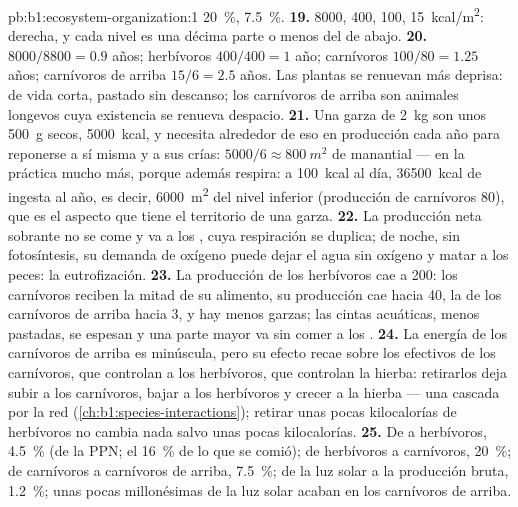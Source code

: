\begin{solution}{pb:b1:ecosystem-organization:1}
\qty{20}{\%}, \qty{7.5}{\%}.
\textbf{19.} \qty{8000}{}, \qty{400}{}, \qty{100}{}, \qty{15}{kcal/m^2}:
derecha, y cada nivel es una décima parte o menos del de abajo.
\textbf{20.}  $8000/8800 = 0.9$ años; herbívoros $400/400 =
1$ año; carnívoros $100/80 = 1.25$ años; carnívoros de arriba $15/6 =
2.5$ años. Las plantas se renuevan más deprisa:  de vida corta,
pastado sin descanso; los carnívoros de arriba son animales longevos cuya
existencia se renueva despacio.
\textbf{21.} Una garza de \qty{2}{kg} son unos \qty{500}{g} secos,
\qty{5000}{kcal}, y necesita alrededor de eso en producción cada año para
reponerse a sí misma y a sus crías: $5000/6 \approx \qty{800}{m^2}$ de
manantial --- en la práctica mucho más, porque además respira: a
\qty{100}{kcal} al día, \qty{36500}{kcal} de ingesta al año, es decir,
\qty{6000}{m^2} del nivel inferior (producción de carnívoros
\qty{80}{}), que es el aspecto que tiene el territorio de una garza.
\textbf{22.} La producción neta sobrante no se come y va a los
, cuya respiración se duplica; de noche, sin
fotosíntesis, su demanda de oxígeno puede dejar el agua sin oxígeno y matar
a los peces: la eutrofización.
\textbf{23.} La producción de los herbívoros cae a \qty{200}{}: los
carnívoros reciben la mitad de su alimento, su producción cae hacia
\qty{40}{}, la de los carnívoros de arriba hacia 3, y hay menos garzas; las
cintas acuáticas, menos pastadas, se espesan y una parte mayor va sin comer
a los .
\textbf{24.} La energía de los carnívoros de arriba es minúscula, pero su
efecto recae sobre los efectivos de los carnívoros, que controlan a los
herbívoros, que controlan la hierba: retirarlos deja subir a los carnívoros,
bajar a los herbívoros y crecer a la hierba --- una cascada por la red
(\cref{ch:b1:species-interactions}); retirar unas pocas kilocalorías de
herbívoros no cambia nada salvo unas pocas kilocalorías.
\textbf{25.} De  a herbívoros, \qty{4.5}{\%} (de la PPN; el
\qty{16}{\%} de lo que se comió); de herbívoros a carnívoros, \qty{20}{\%};
de carnívoros a carnívoros de arriba, \qty{7.5}{\%}; de la luz solar a la
producción bruta, \qty{1.2}{\%}; unas pocas millonésimas de la luz solar
acaban en los carnívoros de arriba.
\end{solution}
